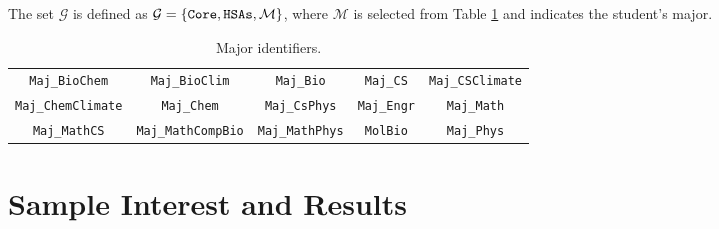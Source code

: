 \documentclass[12pt]{article}
\newcommand{\G}{\mathcal{G}}
\begin{document}
The set $\G$ is defined as $\G=\{\verb|Core|,\verb|HSAs|,\mathcal{M}\}$, where $\mathcal{M}$ is selected from Table \ref{tab:majors} and indicates the student's major.

\begin{table}[H]
    \centering
    \begin{tabular}{|ccccc|}
        \hline
        \verb|Maj_BioChem| & \verb|Maj_BioClim| & \verb|Maj_Bio| & \verb|Maj_CS| & \verb|Maj_CSClimate| \\
        \verb|Maj_ChemClimate| & \verb|Maj_Chem| & \verb|Maj_CsPhys| & \verb|Maj_Engr| & \verb|Maj_Math| \\
        \verb|Maj_MathCS| & \verb|Maj_MathCompBio| & \verb|Maj_MathPhys| & \verb|MolBio| & \verb|Maj_Phys| \\\hline
    \end{tabular}
    \caption{Major identifiers.}
    \label{tab:majors}
\end{table}

{\footnotesize


\begin{landscape}

\end{landscape}
}

\section{Sample Interest and Results}\label{app:sample}

\begin{table}[H]
    \centering
    
    \caption{Math Major Sample Interests. Interests in the generic courses are held at 0, and interests in all other courses are set to $-10$.}
    \label{tab:math-in}
\end{table}

\begin{table}[H]
    \centering
    
    \caption{Math Major Sample Schedule}
    \label{tab:math-out}
\end{table}

\begin{table}[H]
    \centering
    
    \caption{Engineering Major Sample Interests. Interests in the generic courses are held at 0, and interests in all other courses are set to -10.}
    \label{tab:engr-in}
\end{table}
\end{document}
